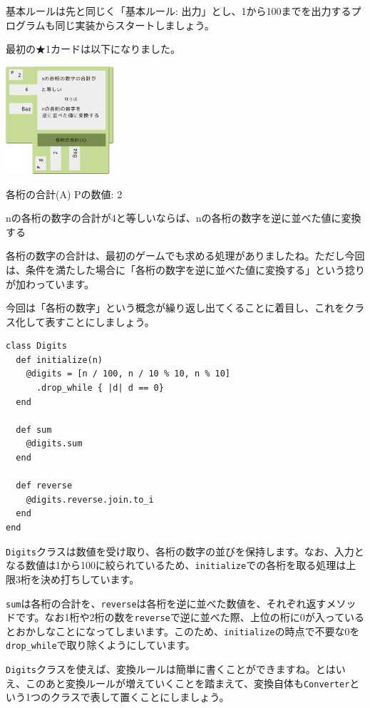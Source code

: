\documentclass[index]{subfiles}
\begin{document}
基本ルールは先と同じく「基本ルール: 出力」とし、1から100までを出力するプログラムも同じ実装からスタートしましょう。

最初の★1カードは以下になりました。

\begin{center}
  \includegraphics[height=4cm]{image/211_replay_2_1.png}
\end{center}

\begin{itembox}[l]{各桁の合計(A)}
Pの数値: 2

nの各桁の数字の合計が4と等しいならば、nの各桁の数字を逆に並べた値に変換する
\end{itembox}

各桁の数字の合計は、最初のゲームでも求める処理がありましたね。ただし今回は、条件を満たした場合に「各桁の数字を逆に並べた値に変換する」という捻りが加わっています。

今回は「各桁の数字」という概念が繰り返し出てくることに着目し、これをクラス化して表すことにしましょう。

\begin{lstlisting}
class Digits
  def initialize(n)
    @digits = [n / 100, n / 10 % 10, n % 10]
      .drop_while { |d| d == 0}
  end

  def sum
    @digits.sum
  end

  def reverse
    @digits.reverse.join.to_i
  end
end
\end{lstlisting}

\verb+Digits+クラスは数値を受け取り、各桁の数字の並びを保持します。なお、入力となる数値は1から100に絞られているため、\verb+initialize+での各桁を取る処理は上限3桁を決め打ちしています。

\verb+sum+は各桁の合計を、\verb+reverse+は各桁を逆に並べた数値を、それぞれ返すメソッドです。なお1桁や2桁の数を\verb+reverse+で逆に並べた際、上位の桁に0が入っているとおかしなことになってしまいます。このため、\verb+initialize+の時点で不要な0を\verb+drop_while+で取り除くようにしています。

\verb+Digits+クラスを使えば、変換ルールは簡単に書くことができますね。とはいえ、このあと変換ルールが増えていくことを踏まえて、変換自体も\verb+Converter+という1つのクラスで表して置くことにしましょう。
\end{document}
